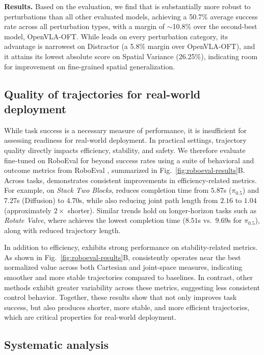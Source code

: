 \textbf{Results.} Based on the evaluation, we find that \molmoactt is substantially more robust to perturbations than all other evaluated models, achieving a 50.7\% average success rate across all perturbation types, with a margin of $\sim$10.8\% over the second-best model, OpenVLA-OFT. While \molmoactt leads on every perturbation category, its advantage is narrowest on Distractor (a 5.8\% margin over OpenVLA-OFT), and it attains its lowest absolute score on Spatial Variance (26.25\%), indicating room for improvement on fine-grained spatial generalization.

\subsection{Quality of \molmoactt trajectories for real-world deployment}

While task success is a necessary measure of performance, it is insufficient for assessing readiness for real-world deployment. In practical settings, trajectory quality directly impacts efficiency, stability, and safety. We therefore evaluate \molmoactt fine-tuned on RoboEval for beyond success rates using a suite of behavioral and outcome metrics from RoboEval \citep{wang2025roboeval}, summarized in Fig.~\ref{fig:roboeval-results}B. Across tasks, \molmoactt demonstrates consistent improvements in efficiency-related metrics. For example, on \textit{Stack Two Blocks}, \molmoactt reduces completion time from $5.87$s ($\pi_{0.5}$) and $7.27$s (Diffusion) to $4.70$s, while also reducing joint path length from $2.16$ to $1.04$ (approximately $2\times$ shorter). Similar trends hold on longer-horizon tasks such as \textit{Rotate Valve}, where \molmoactt achieves the lowest completion time ($8.51$s vs.\ $9.69$s for $\pi_{0.5}$), along with reduced trajectory length.

In addition to efficiency, \molmoactt exhibits strong performance on stability-related metrics. As shown in Fig.~\ref{fig:roboeval-results}B, \molmoactt consistently operates near the best normalized value across both Cartesian and joint-space measures, indicating smoother and more stable trajectories compared to baselines. In contrast, other methods exhibit greater variability across these metrics, suggesting less consistent control behavior. Together, these results show that \molmoactt not only improves task success, but also produces shorter, more stable, and more efficient trajectories, which are critical properties for real-world deployment.

\subsection{Systematic analysis}
\label{sec:exp-systematic}


